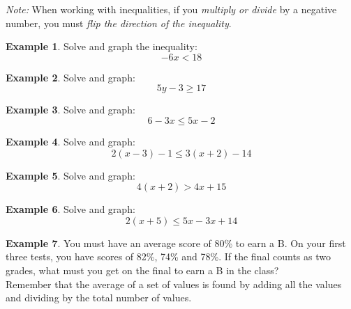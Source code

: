 \documentclass[addpoints,12pt]{exam}
\theoremstyle{definition}
\theoremstyle{break}
\theoremstyle{break}
\newtheorem{example}{Example}[subsection]
\begin{document}
\noindent \emph{Note:} When working with inequalities, if you \emph{multiply or divide} by a negative number, you must \emph{flip the direction of the inequality}.
\vspace{.15in}

\begin{example}
Solve and graph the inequality:
\[-6x < 18\]
\vspace{1.5in}
\end{example}

\begin{example}
Solve and graph:
\[5y - 3 \ge 17\]
\end{example}

\newpage

\begin{example}
Solve and graph:
\[6 - 3x \le 5x - 2\]
\vspace{2in}
\end{example}

\begin{example}
Solve and graph:
\[2(x-3) -1 \le 3(x+2) - 14\]
\vspace{2in}
\end{example}

\begin{example}
Solve and graph:
\[4(x+2) > 4x + 15\]
\vspace{2in}
\end{example}

\newpage

\begin{example}
Solve and graph:
\[2(x+5) \le 5x - 3x + 14\]
\vspace{2in}
\end{example}

\begin{example}
You must have an average score of 80\% to earn a B. On your first three tests, you have scores of 82\%, 74\% and 78\%. If the final counts as two grades, what must you get on the final to earn a B in the class?
\\

\noindent Remember that the average of a set of values is found by adding all the values and dividing by the total number of values.
\end{example}
\end{document}
